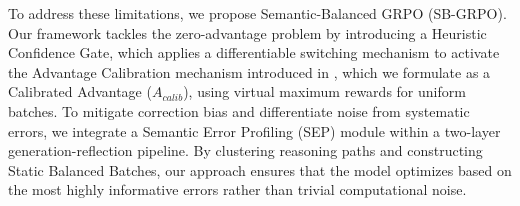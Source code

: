 To address these limitations, we propose Semantic-Balanced GRPO (SB-GRPO). Our framework tackles the zero-advantage problem by introducing a Heuristic Confidence Gate, which applies a differentiable switching mechanism to activate the Advantage Calibration mechanism introduced in \cite{nan2025ngrponegativeenhancedgrouprelative}, which we formulate as a Calibrated Advantage ($A_{calib}$), using virtual maximum rewards for uniform batches. To mitigate correction bias and differentiate noise from systematic errors, we integrate a Semantic Error Profiling (SEP) module within a two-layer generation-reflection pipeline. By clustering reasoning paths and constructing Static Balanced Batches, our approach ensures that the model optimizes based on the most highly informative errors rather than trivial computational noise.




